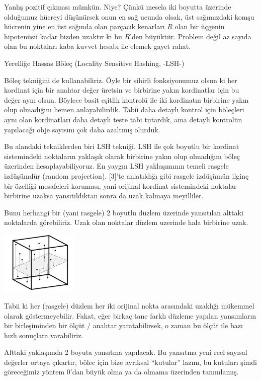 \documentclass[12pt,fleqn]{article}\usepackage{../../common}
\begin{document}
Yanlış pozitif çıkması mümkün. Niye? Çünkü mesela iki boyutta üzerinde olduğumuz
hücreyi düşünürsek onun en sağ ucunda olsak, üst sağımızdaki komşu hücrenin yine
en üst sağında olan parçacık kenarları $R$ olan bir üçgenin hipotenüsü kadar
bizden uzaktır ki bu $R$'den büyüktür. Problem değil az sayıda olan bu noktaları
kaba kuvvet hesabı ile elemek gayet rahat.

Yerelliğe Hassas Böleç (Locality Sensitive Hashing, -LSH-)

Böleç tekniğini de kullanabiliriz. Öyle bir sihirli fonksiyonumuz olsun ki her
kordinat için bir anahtar değer üretsin ve birbirine yakın kordinatlar için bu
değer aynı olsun. Böylece basit eşitlik kontrolü ile iki kordinatın birbirine
yakın olup olmadığını hemen anlayabilirdik. Tabii daha detaylı kontrol için
böleçleri aynı olan kordinatları daha detaylı teste tabi tutardık, ama detaylı
kontrolün yapılacağı obje sayısını çok daha azaltmış olurduk.

Bu alandaki tekniklerden biri LSH tekniği. LSH ile çok boyutlu bir kordinat
sistemindeki noktaların yaklaşık olarak birbirine yakın olup olmadığını böleç
üzerinden hesaplayabiliyoruz. En yaygın LSH yaklaşımının temeli rasgele
izdüşümdür (random projection). [3]'te anlatıldığı gibi rasgele izdüşümün ilginç
bir özelliği mesafeleri koruması, yani orijinal kordinat sistemindeki noktalar
birbirine uzaksa yansıtıldıktan sonra da uzak kalmaya meyilliler.

Bunu herhangi bir (yani rasgele) 2 boyutlu düzlem üzerinde yansıtılan alttaki
noktalarda görebiliriz. Uzak olan noktalar düzlem uzerinde hala birbirine uzak.

\includegraphics[width=10em]{algs_073_hash_01.png}

Tabii ki her (rasgele) düzlem her iki orijinal nokta arasındaki uzaklığı
mükemmel olarak göstermeyebilir. Fakat, eğer birkaç tane farklı düzleme yapılan
yansımların bir birleşiminden bir ölçüt / anahtar yaratabilirsek, o zaman bu
ölçüt ile bazı hızlı sonuçlara varabiliriz.

Alttaki yaklaşımda 2 boyuta yansıtma yapılacak. Bu yansıtma yeni reel sayısal
değerler ortaya çıkartır, bölec için bize ayrıksal ``kutular'' lazım, bu
kutuları şimdi göreceğimiz yöntem 0'dan büyük olma ya da olmama üzerinden
tanımlamış.
\end{document}
